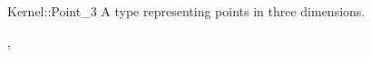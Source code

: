\begin{ccRefConcept}{Kernel::Point_3}
A type representing points in three dimensions.

\ccRefines
{},

\ccSeeAlso
{}

\end{ccRefConcept}
